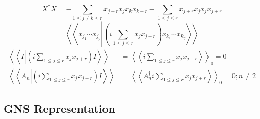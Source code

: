 \documentclass[aps,preprint]{revtex4}%
\begin{document}
\begin{equation}
X^{\dagger}X=-\sum_{1\leq j\neq k\leq r}x_{j+r}x_{j}x_{k}x_{k+r}-\sum_{1\leq
j\leq r}x_{j+r}x_{j}x_{j}x_{j+r}%
\end{equation}%
\begin{equation}
\left\langle \left\langle x_{j_{1}}\cdots x_{j_{p}}\left\vert \left(
i\sum_{1\leq j\leq r}x_{j}x_{j+r}\right)  \right.  x_{k_{1}}\cdots x_{k_{q}%
}\right\rangle \right\rangle
\end{equation}%
\begin{align}
\left\langle \left\langle I\left\vert \left(  i\sum_{1\leq j\leq r}%
x_{j}x_{j+r}\right)  \right.  I\right\rangle \right\rangle  &  =\left\langle
\left\langle i\sum_{1\leq j\leq r}x_{j}x_{j+r}\right\rangle \right\rangle
_{0}=0\\
\left\langle \left\langle A_{n}\left\vert \left(  i\sum_{1\leq j\leq r}%
x_{j}x_{j+r}\right)  \right.  I\right\rangle \right\rangle  &  =\left\langle
\left\langle A_{n}^{\dagger}i\sum_{1\leq j\leq r}x_{j}x_{j+r}\right\rangle
\right\rangle _{0}=0;n\neq2
\end{align}


\subsection{GNS Representation}
\end{document}
